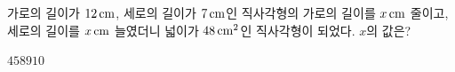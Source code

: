가로의 길이가 $12\mkern3mu \mathrm{cm}$, 세로의 길이가 $7\mkern3mu \mathrm{cm}$인 직사각형의 가로의 길이를 $x\mkern3mu \mathrm{cm}$ 줄이고, 세로의 길이를 $x\mkern3mu \mathrm{cm}$ 늘였더니 넓이가 $48\mkern3mu \mathrm{cm}^2$인 직사각형이 되었다. $x$의 값은?
\begin{choices32}{$4$}{$5$}{$8$}{$9$}{$10$}\end{choices32}
